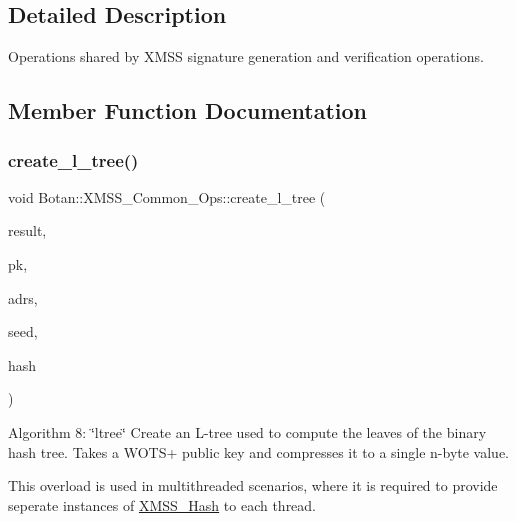 \subsection{Detailed Description}
Operations shared by X\+M\+SS signature generation and verification operations. 

\subsection{Member Function Documentation}
\mbox{\label{class_botan_1_1_x_m_s_s___common___ops_a9c24984fc8983bab2106a3e702d02c91}} 
\subsubsection{\texorpdfstring{create\+\_\+l\+\_\+tree()}{create\_l\_tree()}\hspace{0.1cm}{\footnotesize\ttfamily [1/2]}}
{\footnotesize\ttfamily void Botan\+::\+X\+M\+S\+S\+\_\+\+Common\+\_\+\+Ops\+::create\+\_\+l\+\_\+tree (\begin{DoxyParamCaption}\item[{secure\+\_\+vector$<$ uint8\+\_\+t $>$ \&}]{result,  }\item[{wots\+\_\+keysig\+\_\+t}]{pk,  }\item[{\hyperlink{class_botan_1_1_x_m_s_s___address}{X\+M\+S\+S\+\_\+\+Address} \&}]{adrs,  }\item[{const secure\+\_\+vector$<$ uint8\+\_\+t $>$ \&}]{seed,  }\item[{\hyperlink{class_botan_1_1_x_m_s_s___hash}{X\+M\+S\+S\+\_\+\+Hash} \&}]{hash }\end{DoxyParamCaption})\hspace{0.3cm}{\ttfamily [protected]}}

Algorithm 8\+: \char`\"{}ltree\char`\"{} Create an L-\/tree used to compute the leaves of the binary hash tree. Takes a W\+O\+T\+S+ public key and compresses it to a single n-\/byte value.

This overload is used in multithreaded scenarios, where it is required to provide seperate instances of \hyperlink{class_botan_1_1_x_m_s_s___hash}{X\+M\+S\+S\+\_\+\+Hash} to each thread.


